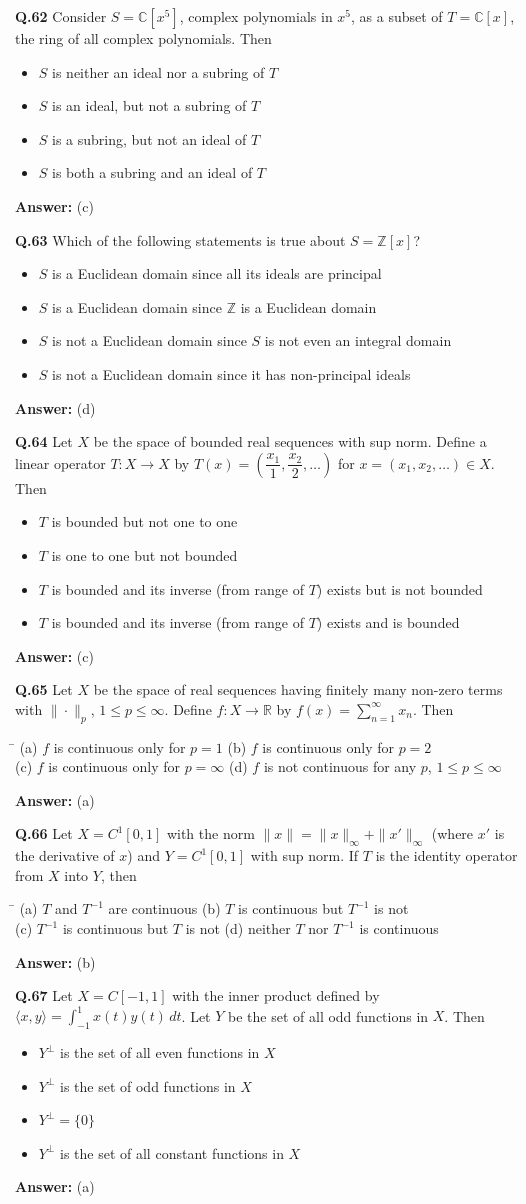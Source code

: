 \documentclass[11pt,a4paper]{article}
\newcommand{\optsfour}[4]{%
  \begin{tabbing}
    \hspace{0.48\linewidth}\=\kill
    (a) #1 \> (b) #2 \\[2pt]
    (c) #3 \> (d) #4
  \end{tabbing}%
}
\newcommand{\optslist}[4]{%
  \begin{itemize}
    \setlength{\itemsep}{2pt}\setlength{\parskip}{0pt}
    \item[(a)] #1
    \item[(b)] #2
    \item[(c)] #3
    \item[(d)] #4
  \end{itemize}%
}
\newcommand{\ans}[1]{\textbf{Answer:} #1\par\medskip}
\begin{document}
\textbf{Q.62} Consider $S = \mathbb{C}[x^5]$, complex polynomials in $x^5$, as a subset of $T = \mathbb{C}[x]$, the ring of all complex polynomials. Then
\optslist{$S$ is neither an ideal nor a subring of $T$}{$S$ is an ideal, but not a subring of $T$}{$S$ is a subring, but not an ideal of $T$}{$S$ is both a subring and an ideal of $T$}
\ans{(c)}

\textbf{Q.63} Which of the following statements is true about $S = \mathbb{Z}[x]$?
\optslist{$S$ is a Euclidean domain since all its ideals are principal}{$S$ is a Euclidean domain since $\mathbb{Z}$ is a Euclidean domain}{$S$ is not a Euclidean domain since $S$ is not even an integral domain}{$S$ is not a Euclidean domain since it has non-principal ideals}
\ans{(d)}

\textbf{Q.64} Let $X$ be the space of bounded real sequences with sup norm. Define a linear operator $T : X \to X$ by $T(x) = \left(\dfrac{x_1}{1}, \dfrac{x_2}{2}, \dots\right)$ for $x = (x_1, x_2, \dots) \in X$. Then
\optslist{$T$ is bounded but not one to one}{$T$ is one to one but not bounded}{$T$ is bounded and its inverse (from range of $T$) exists but is not bounded}{$T$ is bounded and its inverse (from range of $T$) exists and is bounded}
\ans{(c)}

\textbf{Q.65} Let $X$ be the space of real sequences having finitely many non-zero terms with $\|\cdot\|_p$, $1 \le p \le \infty$. Define $f : X \to \mathbb{R}$ by $f(x) = \displaystyle\sum_{n=1}^{\infty} x_n$. Then
\optsfour{$f$ is continuous only for $p = 1$}{$f$ is continuous only for $p = 2$}{$f$ is continuous only for $p = \infty$}{$f$ is not continuous for any $p$, $1 \le p \le \infty$}
\ans{(a)}

\textbf{Q.66} Let $X = C^1[0,1]$ with the norm $\|x\| = \|x\|_\infty + \|x'\|_\infty$ (where $x'$ is the derivative of $x$) and $Y = C^1[0,1]$ with sup norm. If $T$ is the identity operator from $X$ into $Y$, then
\optsfour{$T$ and $T^{-1}$ are continuous}{$T$ is continuous but $T^{-1}$ is not}{$T^{-1}$ is continuous but $T$ is not}{neither $T$ nor $T^{-1}$ is continuous}
\ans{(b)}

\textbf{Q.67} Let $X = C[-1,1]$ with the inner product defined by $\langle x, y \rangle = \displaystyle\int_{-1}^{1} x(t)y(t)\,dt$. Let $Y$ be the set of all odd functions in $X$. Then
\optslist{$Y^\perp$ is the set of all even functions in $X$}{$Y^\perp$ is the set of odd functions in $X$}{$Y^\perp = \{0\}$}{$Y^\perp$ is the set of all constant functions in $X$}
\ans{(a)}
\end{document}
